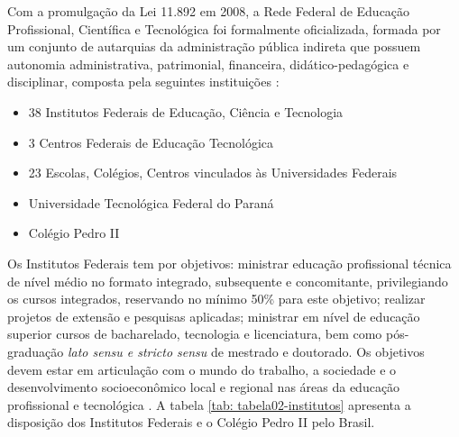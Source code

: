 Com a promulgação da Lei 11.892 em 2008, a Rede Federal de Educação Profissional, Científica e Tecnológica foi formalmente oficializada, formada por um conjunto de autarquias da administração pública indireta que possuem autonomia administrativa, patrimonial, financeira, didático-pedagógica e disciplinar, composta pela seguintes instituições \cite{brasil2008}:

\begin{itemize}
    \item 38 Institutos Federais de Educação, Ciência e Tecnologia
    \item 3 Centros Federais de Educação Tecnológica
    \item 23 Escolas, Colégios, Centros vinculados às Universidades Federais
    \item Universidade Tecnológica Federal do Paraná
    \item Colégio Pedro II
\end{itemize}

\newpage

Os Institutos Federais tem por objetivos: ministrar educação profissional técnica de nível médio no formato integrado, subsequente e concomitante,  privilegiando os cursos integrados, reservando no mínimo 50\% para este objetivo; realizar projetos de extensão e pesquisas aplicadas; ministrar em nível de educação superior cursos de bacharelado, tecnologia e licenciatura, bem como pós-graduação \textit{lato sensu e stricto sensu} de mestrado e doutorado. Os objetivos devem estar em articulação com o mundo do trabalho, a sociedade e o desenvolvimento socioeconômico local e regional nas áreas da educação profissional e tecnológica \cite{brasil2008}. A tabela \ref{tab: tabela02-institutos} apresenta a disposição dos Institutos Federais e o Colégio Pedro II pelo Brasil.

